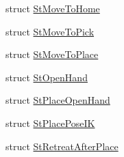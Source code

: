 \begin{DoxyCompactItemize}
struct \hyperlink{structsm__mtc__picknplace_1_1StMoveToHome}{St\+Move\+To\+Home}
\item 
struct \hyperlink{structsm__mtc__picknplace_1_1StMoveToPick}{St\+Move\+To\+Pick}
\item 
struct \hyperlink{structsm__mtc__picknplace_1_1StMoveToPlace}{St\+Move\+To\+Place}
\item 
struct \hyperlink{structsm__mtc__picknplace_1_1StOpenHand}{St\+Open\+Hand}
\item 
struct \hyperlink{structsm__mtc__picknplace_1_1StPlaceOpenHand}{St\+Place\+Open\+Hand}
\item 
struct \hyperlink{structsm__mtc__picknplace_1_1StPlacePoseIK}{St\+Place\+Pose\+IK}
\item 
struct \hyperlink{structsm__mtc__picknplace_1_1StRetreatAfterPlace}{St\+Retreat\+After\+Place}
\end{DoxyCompactItemize}
